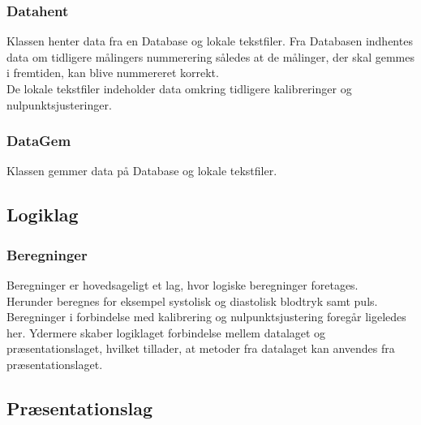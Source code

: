 \subsubsection{Datahent}
Klassen henter data fra en Database og lokale tekstfiler. Fra Databasen indhentes data om tidligere målingers nummerering således at de målinger, der skal gemmes i fremtiden, kan blive nummereret korrekt.\\
De lokale tekstfiler indeholder data omkring tidligere kalibreringer og nulpunktsjusteringer.

\subsubsection{DataGem}
Klassen gemmer data på Database og lokale tekstfiler.

\subsection{Logiklag}

\subsubsection{Beregninger}
Beregninger er hovedsageligt et lag, hvor logiske beregninger foretages.\\
Herunder beregnes for eksempel systolisk og diastolisk blodtryk samt puls. Beregninger i forbindelse med kalibrering og nulpunktsjustering foregår ligeledes her. Ydermere skaber logiklaget forbindelse mellem datalaget og præsentationslaget, hvilket tillader, at metoder fra datalaget kan anvendes fra præsentationslaget.

\subsection{Præsentationslag}

